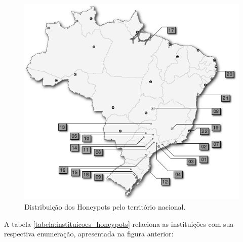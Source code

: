 \begin{figure}[H]
    \begin{center}
        \includegraphics[scale=0.6]{./figuras/honeypots-alliance-map-GS.png}

        \caption{\label{figura:distribuicao_honeypots}Distribuição dos Honeypots pelo território nacional.}
    \end{center}
\end{figure}

A tabela \ref{tabela:instituicoes_honeypots} relaciona as instituições com sua respectiva enumeração, apresentada na figura anterior:

